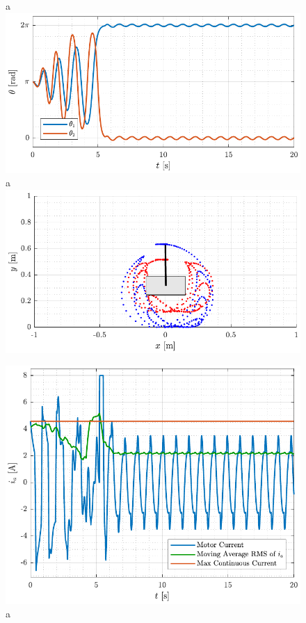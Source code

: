 
























\begin{figure}[H]
  \hspace{-10pt}
  \captionbox 
  {
    a
    \label{fig:theta_twinSwingAndCatch}
  }
  {
    \hspace{-1cm}
    \includegraphics[width=.46\textwidth]{figures/theta_twinSwingAndCatch}
  }
  \hspace{20pt}
  \captionbox 
  {
    a
    \label{fig:ani_twinSwingAndCatch}
  }
  {
    \hspace{-1cm}
    \includegraphics[width=.46\textwidth]{figures/ani_twinSwingAndCatch}
  }
\end{figure}
%
%
\begin{figure}[H]
  \includegraphics[width=.5\textwidth]{figures/ia_twinSwingAndCatch}
  \caption{a}
  \label{fig:ia_twinSwingAndCatch}
\end{figure}
